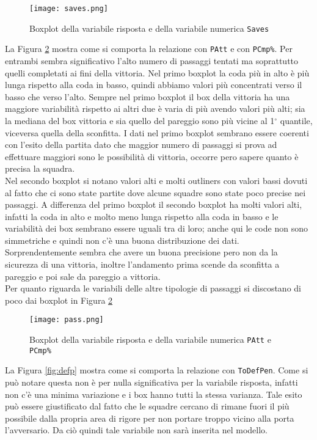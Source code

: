 \begin{figure}[htbp]
	\begin{center}
		\texttt{[image: saves.png]}
		\caption{Boxplot della variabile risposta e della variabile numerica \texttt{Saves} } \label{fig:saves}
	\end{center}
\end{figure}

La Figura \ref{fig:pass} mostra come si comporta la relazione con \texttt{PAtt} e con \texttt{PCmp\%}. Per entrambi sembra significativo l'alto numero di passaggi tentati ma soprattutto quelli completati ai fini della vittoria. Nel primo boxplot la coda più in alto è più lunga rispetto alla coda in basso, quindi abbiamo valori più concentrati verso il basso che verso l'alto. Sempre nel primo boxplot il box della vittoria ha una maggiore variabilità rispetto ai altri due è varia di più avendo valori più alti; sia la mediana del box vittoria e sia quello del pareggio sono più vicine al 1${^\circ}$ quantile, viceversa quella della sconfitta. I dati nel primo boxplot sembrano essere coerenti con l'esito della partita dato che maggior numero di passaggi si prova ad effettuare maggiori sono le possibilità di vittoria, occorre pero sapere quanto è precisa la squadra.\\
Nel secondo boxplot si notano valori alti e molti outliners con valori bassi dovuti al fatto che ci sono state partite dove alcune squadre sono state poco precise nei passaggi. A differenza del primo boxplot il secondo boxplot ha molti valori alti, infatti la coda in alto e molto meno lunga rispetto alla coda in basso e le variabilità dei box sembrano essere uguali tra di loro; anche qui le code non sono simmetriche e quindi non c'è una buona distribuzione dei dati. Sorprendentemente sembra che avere un buona precisione pero non da la sicurezza di una vittoria, inoltre l'andamento prima scende da sconfitta a pareggio e poi sale da pareggio a vittoria.\\
Per quanto riguarda le variabili delle altre tipologie di passaggi si discostano di poco dai boxplot in Figura \ref{fig:pass}

\begin{figure}[htbp]
	\begin{center}
		\texttt{[image: pass.png]}
		\caption{Boxplot della variabile risposta e della variabile numerica \texttt{PAtt} e \texttt{PCmp\%}  } \label{fig:pass}
	\end{center}
\end{figure}
\bigskip
La Figura \ref{fig:defp} mostra come si comporta la relazione con \texttt{ToDefPen}. Come si può notare questa non è per nulla significativa per la variabile risposta, infatti non c'è una minima variazione e i box hanno tutti la stessa varianza. Tale esito può essere giustificato dal fatto che le squadre cercano di rimane fuori il più possibile dalla propria area di rigore per non portare troppo vicino alla porta l'avversario. Da ciò quindi tale variabile non sarà inserita nel modello.\\

